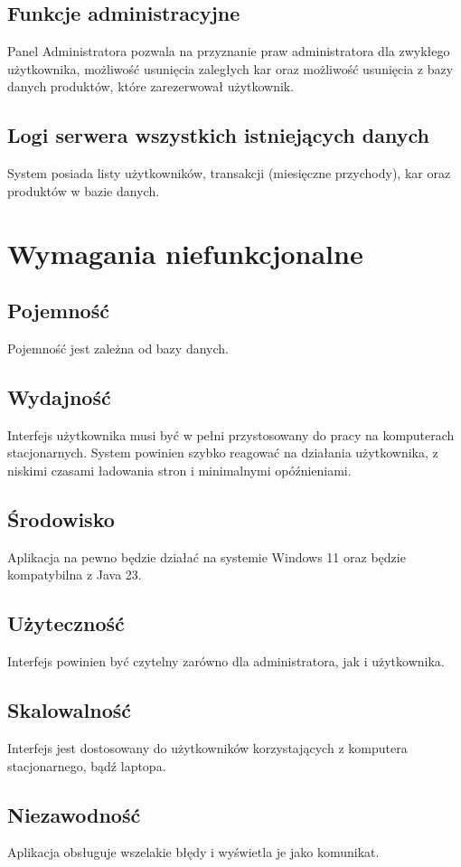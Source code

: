 \subsection{Funkcje administracyjne}
\label{subsec:Funkcje administracyjne}
Panel Administratora pozwala na przyznanie praw administratora dla zwykłego użytkownika, możliwość usunięcia zaległych kar oraz możliwość usunięcia z bazy danych produktów, które zarezerwował użytkownik.

\subsection{Logi serwera wszystkich istniejących danych}
\label{subsec:Logi serwera wszystkich istniejących danych}
System posiada listy użytkowników, transakcji (miesięczne przychody), kar oraz produktów w bazie danych.

\section{Wymagania niefunkcjonalne}
\label{sec:Wymagania niefunkcjonalne}

\subsection{Pojemność}
\label{subsec:Pojemność}
Pojemność jest zależna od bazy danych.

\subsection{Wydajność}
\label{subsec:Wydajność}
Interfejs użytkownika musi być w pełni przystosowany do pracy na komputerach stacjonarnych. System powinien szybko reagować na działania użytkownika, z niskimi czasami ładowania stron i minimalnymi opóźnieniami.

\subsection{Środowisko}
\label{subsec:Środowisko}
Aplikacja na pewno będzie działać na systemie Windows 11 oraz będzie kompatybilna z Java 23.

\subsection{Użyteczność}
\label{subsec:Użyteczność}
Interfejs powinien być czytelny zarówno dla administratora, jak i użytkownika.

\subsection{Skalowalność}
\label{subsec:Skalowalność}
Interfejs jest dostosowany do użytkowników korzystających z komputera stacjonarnego, bądź laptopa.

\subsection{Niezawodność}
\label{subsec:Niezawodność}
Aplikacja obsługuje wszelakie błędy i wyświetla je jako komunikat.